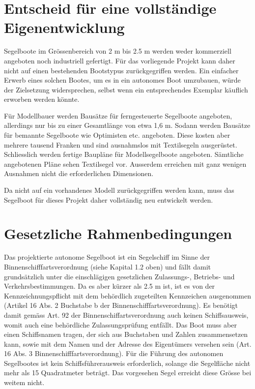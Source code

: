 \section{Entscheid für eine vollständige Eigenentwicklung}
Segelboote im Grössenbereich von 2 m bis 2.5 m werden weder kommerziell angeboten noch industriell gefertigt. Für das vorliegende Projekt kann daher nicht auf einen bestehenden Bootstypus zurückgegriffen werden. Ein einfacher Erwerb eines solchen Bootes, um es in ein autonomes Boot umzubauen, würde der Zielsetzung widersprechen, selbst wenn ein entsprechendes Exemplar käuflich erworben werden könnte.

Für Modellbauer werden Bausätze für ferngesteuerte Segelboote angeboten, allerdings nur bis zu einer Gesamtlänge von etwa 1,6 m. Sodann werden Bausätze für bemannte Segelboote wie Optimisten etc. angeboten. Diese kosten aber mehrere tausend Franken und sind ausnahmslos mit Textilsegeln ausgerüstet.  
Schliesslich werden fertige Baupläne für Modellsegelboote angeboten. Sämtliche angebotenen Pläne sehen Textilsegel vor. Ausserdem erreichen mit ganz wenigen Ausnahmen nicht die erforderlichen Dimensionen. 

Da nicht auf ein vorhandenes Modell zurückgegriffen werden kann, muss das Segelboot für dieses Projekt daher vollständig neu entwickelt werden. 



\section{Gesetzliche Rahmenbedingungen}

Das projektierte autonome Segelboot ist ein Segelschiff im Sinne der Binnenschifffartsverordnung (siehe Kapital 1.2 oben) und fällt damit grundsätzlich unter die einschlägigen gesetzlichen Zulassungs-, Betriebs- und Verkehrsbestimmungen. Da es aber kürzer als 2.5 m ist, ist es von der Kennzeichnungspflicht mit dem behördlich zugeteilten Kennzeichen ausgenommen (Artikel 16 Abs. 2 Buchstabe b der Binnenschifffartsverordnung). Es benötigt damit gemäss Art. 92 der Binnenschiffartsverordnung auch keinen Schiffsausweis, womit auch eine behördliche Zulassungsprüfung entfällt. Das Boot muss aber einen Schiffsnamen tragen, der sich aus Buchstaben und Zahlen zusammensetzen kann, sowie mit dem Namen und der Adresse des Eigentümers versehen sein (Art. 16 Abs. 3 Binnenschifffartsverordnung). Für die Führung des autonomen Segelbootes ist kein Schiffsführerausweis erforderlich, solange die Segelfläche nicht mehr als 15 Quadratmeter beträgt. Das vorgesehen Segel erreicht diese Grösse bei weitem nicht. 

